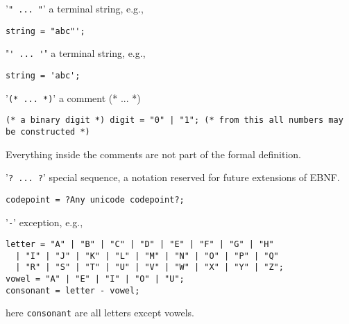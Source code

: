 \documentclass[fsharpnotes.tex]{subfiles}
\begin{document}
\begin{description}
\item '\lstinline[language=ebnf]|" ... "|' a terminal string, e.g.,
  \begin{lstlisting}[language=ebnf]
string = "abc"';
  \end{lstlisting}
\item "\lstinline[language=ebnf]|' ... '|" a terminal string, e.g.,
  \begin{lstlisting}[language=ebnf]
string = 'abc';
  \end{lstlisting}
\item '\lstinline[language=ebnf]|(* ... *)|' a comment (* ... *) 
  \begin{lstlisting}[language=ebnf]
(* a binary digit *) digit = "0" | "1"; (* from this all numbers may be constructed *)
  \end{lstlisting}
  Everything inside the comments are not part of the formal definition.
\item '\lstinline[language=ebnf]|? ... ?|' special sequence, a notation reserved for future extensions of EBNF.
  \begin{lstlisting}[language=ebnf]
codepoint = ?Any unicode codepoint?;
  \end{lstlisting}
\item '\lstinline[language=ebnf]|-|' exception, e.g.,
  \begin{lstlisting}[language=ebnf]
letter = "A" | "B" | "C" | "D" | "E" | "F" | "G" | "H" 
  | "I" | "J" | "K" | "L" | "M" | "N" | "O" | "P" | "Q" 
  | "R" | "S" | "T" | "U" | "V" | "W" | "X" | "Y" | "Z";
vowel = "A" | "E" | "I" | "O" | "U"; 
consonant = letter - vowel;
  \end{lstlisting}
  here \lstinline[language=ebnf]|consonant| are all letters except vowels.
\end{description}
\end{document}
